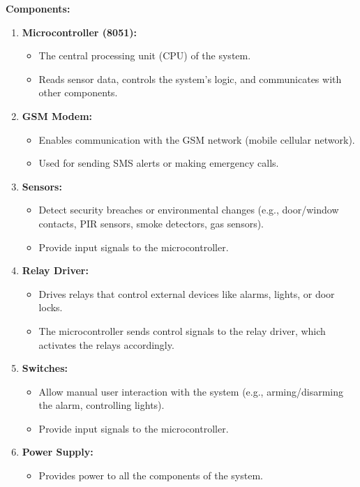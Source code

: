 \documentclass[
]{article}
\begin{document}
\textbf{Components:}

\begin{enumerate}
\def\labelenumi{\arabic{enumi}.}
\item
  \textbf{Microcontroller (8051):}

  \begin{itemize}
  \item
    The central processing unit (CPU) of the system.
  \item
    Reads sensor data, controls the system's logic, and communicates
    with other components.
  \end{itemize}
\item
  \textbf{GSM Modem:}

  \begin{itemize}
  \item
    Enables communication with the GSM network (mobile cellular
    network).
  \item
    Used for sending SMS alerts or making emergency calls.
  \end{itemize}
\item
  \textbf{Sensors:}

  \begin{itemize}
  \item
    Detect security breaches or environmental changes (e.g., door/window
    contacts, PIR sensors, smoke detectors, gas sensors).
  \item
    Provide input signals to the microcontroller.
  \end{itemize}
\item
  \textbf{Relay Driver:}

  \begin{itemize}
  \item
    Drives relays that control external devices like alarms, lights, or
    door locks.
  \item
    The microcontroller sends control signals to the relay driver, which
    activates the relays accordingly.
  \end{itemize}
\item
  \textbf{Switches:}

  \begin{itemize}
  \item
    Allow manual user interaction with the system (e.g.,
    arming/disarming the alarm, controlling lights).
  \item
    Provide input signals to the microcontroller.
  \end{itemize}
\item
  \textbf{Power Supply:}

  \begin{itemize}
  \item
    Provides power to all the components of the system.
  \end{itemize}
\end{enumerate}
\end{document}
